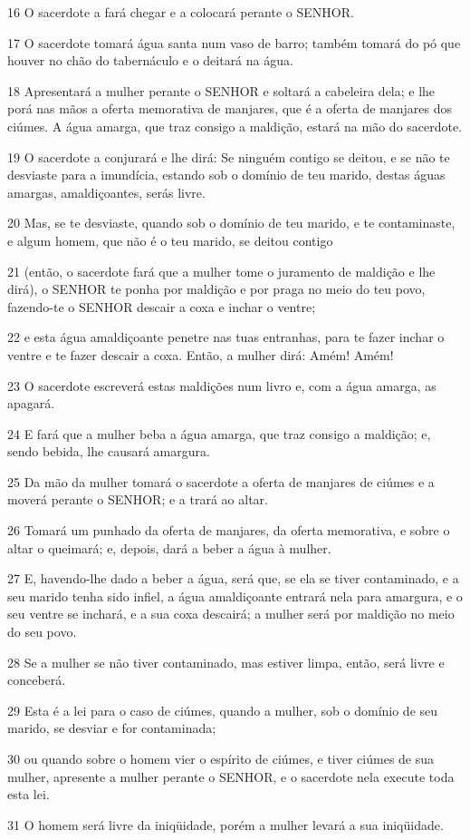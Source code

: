 \par 16 O sacerdote a fará chegar e a colocará perante o SENHOR.
\par 17 O sacerdote tomará água santa num vaso de barro; também tomará do pó que houver no chão do tabernáculo e o deitará na água.
\par 18 Apresentará a mulher perante o SENHOR e soltará a cabeleira dela; e lhe porá nas mãos a oferta memorativa de manjares, que é a oferta de manjares dos ciúmes. A água amarga, que traz consigo a maldição, estará na mão do sacerdote.
\par 19 O sacerdote a conjurará e lhe dirá: Se ninguém contigo se deitou, e se não te desviaste para a imundícia, estando sob o domínio de teu marido, destas águas amargas, amaldiçoantes, serás livre.
\par 20 Mas, se te desviaste, quando sob o domínio de teu marido, e te contaminaste, e algum homem, que não é o teu marido, se deitou contigo
\par 21 (então, o sacerdote fará que a mulher tome o juramento de maldição e lhe dirá), o SENHOR te ponha por maldição e por praga no meio do teu povo, fazendo-te o SENHOR descair a coxa e inchar o ventre;
\par 22 e esta água amaldiçoante penetre nas tuas entranhas, para te fazer inchar o ventre e te fazer descair a coxa. Então, a mulher dirá: Amém! Amém!
\par 23 O sacerdote escreverá estas maldições num livro e, com a água amarga, as apagará.
\par 24 E fará que a mulher beba a água amarga, que traz consigo a maldição; e, sendo bebida, lhe causará amargura.
\par 25 Da mão da mulher tomará o sacerdote a oferta de manjares de ciúmes e a moverá perante o SENHOR; e a trará ao altar.
\par 26 Tomará um punhado da oferta de manjares, da oferta memorativa, e sobre o altar o queimará; e, depois, dará a beber a água à mulher.
\par 27 E, havendo-lhe dado a beber a água, será que, se ela se tiver contaminado, e a seu marido tenha sido infiel, a água amaldiçoante entrará nela para amargura, e o seu ventre se inchará, e a sua coxa descairá; a mulher será por maldição no meio do seu povo.
\par 28 Se a mulher se não tiver contaminado, mas estiver limpa, então, será livre e conceberá.
\par 29 Esta é a lei para o caso de ciúmes, quando a mulher, sob o domínio de seu marido, se desviar e for contaminada;
\par 30 ou quando sobre o homem vier o espírito de ciúmes, e tiver ciúmes de sua mulher, apresente a mulher perante o SENHOR, e o sacerdote nela execute toda esta lei.
\par 31 O homem será livre da iniqüidade, porém a mulher levará a sua iniqüidade.

